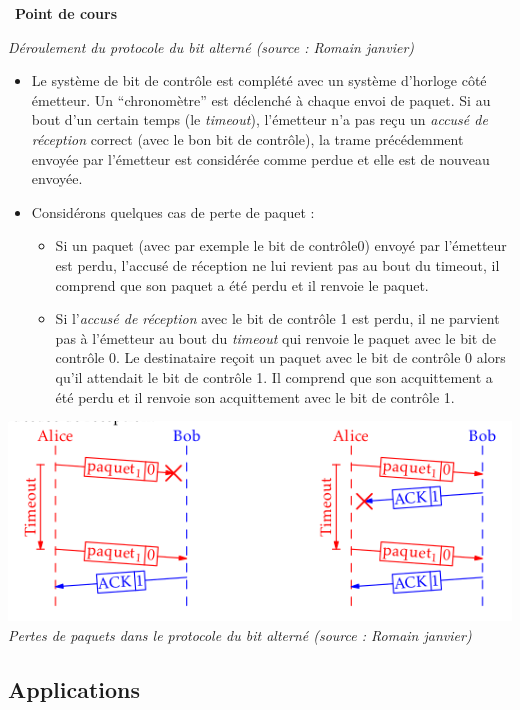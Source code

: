 \documentclass[
  11pt,
]{article}
\providecommand{\tightlist}{%
  \setlength{\itemsep}{0pt}\setlength{\parskip}{0pt}}
\newcounter{cours}
\newenvironment{cours}[1]
{\par \medskip   \addtocounter{cours}{1} \noindent  
\begin{bclogo}[arrondi =0.1,  ombre = true, barre=none, logo=\bcbook, marge=4]{~\textbf{Point de cours} \textbf{\thecours} {\itshape #1} }  \par}
{
\end{bclogo}
 \par \bigskip }
\begin{document}
\begin{cours}{}
\emph{Déroulement du protocole du bit alterné (source : Romain janvier)}

\begin{itemize}
\item
  Le système de bit de contrôle est complété avec un système d'horloge
  côté émetteur. Un ``chronomètre'' est déclenché à chaque envoi de
  paquet. Si au bout d'un certain temps (le \emph{timeout}), l'émetteur
  n'a pas reçu un \emph{accusé de réception} correct (avec le bon bit de
  contrôle), la trame précédemment envoyée par l'émetteur est considérée
  comme perdue et elle est de nouveau envoyée.
\item
  Considérons quelques cas de perte de paquet :

  \begin{itemize}
  \tightlist
  \item
    Si un paquet (avec par exemple le bit de contrôle0) envoyé par
    l'émetteur est perdu, l'accusé de réception ne lui revient pas au
    bout du timeout, il comprend que son paquet a été perdu et il
    renvoie le paquet.
  \item
    Si l'\emph{accusé de réception} avec le bit de contrôle 1 est perdu,
    il ne parvient pas à l'émetteur au bout du \emph{timeout} qui
    renvoie le paquet avec le bit de contrôle 0. Le destinataire reçoit
    un paquet avec le bit de contrôle 0 alors qu'il attendait le bit de
    contrôle 1. Il comprend que son acquittement a été perdu et il
    renvoie son acquittement avec le bit de contrôle 1.
  \end{itemize}
\end{itemize}

\includegraphics{images/bit_alterne2.png}\\

\emph{Pertes de paquets dans le protocole du bit alterné (source :
Romain janvier)}

\end{cours}

\hypertarget{applications}{%
\subsection{Applications}\label{applications}}
\end{document}
